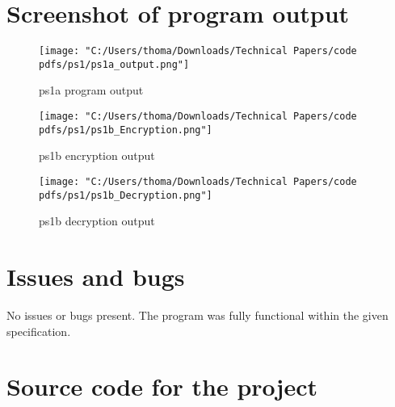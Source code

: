 \documentclass[12pt]{article}
\begin{document}
\section[4]{Screenshot of program output}
\begin{figure}[H]
  \centering
  \texttt{[image: "C:/Users/thoma/Downloads/Technical Papers/code pdfs/ps1/ps1a\_output.png"]}
  \caption{ps1a program output}
  \label{fig:ps1a_output}
\end{figure}
\begin{figure}[H]
  \centering
  \texttt{[image: "C:/Users/thoma/Downloads/Technical Papers/code pdfs/ps1/ps1b\_Encryption.png"]}
  \caption{ps1b encryption output}
  \label{fig:ps1b_Eoutput}
\end{figure}
\begin{figure}[H]
  \centering
  \texttt{[image: "C:/Users/thoma/Downloads/Technical Papers/code pdfs/ps1/ps1b\_Decryption.png"]}
  \caption{ps1b decryption output}
  \label{fig:ps1b_Doutput}
\end{figure}

\section[5]{Issues and bugs}
\hfill\begin{minipage}{\dimexpr\textwidth-1cm}
No issues or bugs present. \newline
The program was fully functional within the given specification.
\end{minipage}

\section[6]{Source code for the project}

\end{document}
